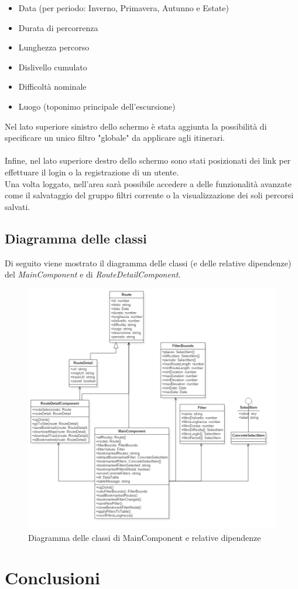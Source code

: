 \documentclass[11pt]{report}
\begin{document}
\begin{itemize}
	\item Data (per periodo: Inverno, Primavera, Autunno e Estate)
	\item Durata di percorrenza
	\item Lunghezza percorso
	\item Dislivello cumulato
	\item Difficoltà nominale
	\item Luogo (toponimo principale dell'escursione)
\end{itemize}
Nel lato superiore sinistro dello schermo è stata aggiunta la possibilità di specificare un unico filtro "globale" da applicare agli itinerari.
\\\\Infine, nel lato superiore destro dello schermo sono stati posizionati dei link per effettuare il login o la registrazione di un utente.
\\Una volta loggato, nell'area sarà possibile accedere a delle funzionalità avanzate come il salvataggio del gruppo filtri corrente o la visualizzazione dei soli percorsi salvati.
\pagebreak
\subsection{Diagramma delle classi}
Di seguito viene mostrato il diagramma delle classi (e delle relative dipendenze) del \textit{MainComponent} e di \textit{RouteDetailComponent}.
\begin{figure}[h]
	\centering
	\includegraphics[scale=0.45]{ClassDiagram_Frontend}
	\caption{Diagramma delle classi di MainComponent e relative dipendenze \label{ClassDiagram_Frontend}}
\end{figure}
\pagebreak
\section{Conclusioni}
\end{document}

